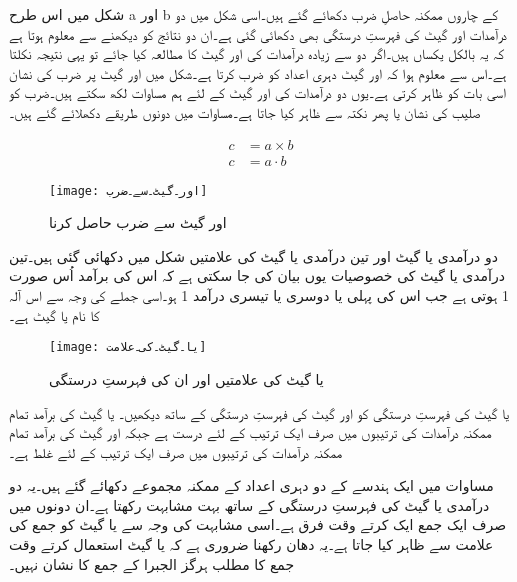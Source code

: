 شکل میں اس طرح a اور b کے چاروں ممکنہ حاصلِ ضرب دکھائے گئے ہیں۔اسی شکل میں دو درآمدات اور گیٹ کی فہرستِ درستگی بھی دکھائی گئی ہے۔ان دو نتائج کو دیکھنے سے معلوم ہوتا ہے کہ یہ بالکل یکساں ہیں۔اگر دو سے زیادہ درآمدات کی اور گیٹ کا مطالعہ کیا جائے تو یہی نتیجہ نکلتا ہے۔اس سے معلوم ہوا کہ اور گیٹ دہری اعداد کو ضرب کرتا ہے۔شکل میں اور گیٹ پر ضرب کی نشان اسی بات کو ظاہر کرتی ہے۔یوں دو درآمدات کی اور گیٹ کے لئے ہم  مساوات  لکھ سکتے ہیں۔ضرب کو صلیب کی نشان یا پھر نکتہ سے ظاہر کیا جاتا ہے۔مساوات میں دونوں طریقے دکھلائے گئے ہیں۔

\begin{align}   \label{مساوات۔اور۔گیٹ۔سے۔دہری۔ضرب}
c &=a \times b \\
c &=a \cdot b
\end{align}


\begin{figure}[th] 
 \begin{center}
  \texttt{[image: اور۔گیٹ۔سے۔ضرب]}
 \end{center}
\caption{اور گیٹ سے ضرب حاصل کرنا}
\label{شکل۔اور۔گیٹ۔سے۔ضرب}
\end{figure}


دو درآمدی یا گیٹ  اور تین درآمدی یا گیٹ کی علامتیں شکل  میں دکھائی گئی ہیں۔تین درآمدی یا گیٹ کی خصوصیات یوں بیان کی جا سکتی ہے کہ اس کی برآمد اُس صورت 1 ہوتی ہے جب اس کی پہلی یا دوسری یا تیسری درآمد 1 ہو۔اسی جملے کی وجہ سے اس آلہ کا نام یا گیٹ ہے۔

\begin{figure}[th]
 \begin{center}
  \texttt{[image: یا۔گیٹ۔کی۔علامت]}
 \end{center}
\caption{یا گیٹ کی علامتیں اور ان کی فہرستِ درستگی}
\label{شکل۔یا۔گیٹ۔کی۔علامت}
\end{figure}

یا گیٹ کی فہرستِ درستگی کو اور گیٹ کی فہرستِ درستگی کے ساتھ دیکھیں۔ یا گیٹ کی برآمد تمام ممکنہ درآمدات کی ترتیبوں میں صرف ایک ترتیب کے لئے درست ہے جبکہ اور گیٹ کی برآمد تمام ممکنہ درآمدات کی ترتیبوں میں صرف ایک ترتیب کے لئے غلط ہے۔

مساوات  میں ایک ہندسے کے دو دہری اعداد کے ممکنہ مجموعے دکھائے گئے ہیں۔یہ دو درآمدی یا گیٹ کی فہرستِ درستگی کے ساتھ بہت مشابہت رکھتا ہے۔ان دونوں میں صرف ایک جمع ایک کرتے وقت فرق ہے۔اسی مشابہت کی وجہ سے یا گیٹ کو جمع کی علامت سے ظاہر کیا جاتا ہے۔یہ دھان رکھنا ضروری ہے کہ یا گیٹ استعمال کرتے وقت جمع کا مطلب ہرگز الجبرا کے جمع کا نشان نہیں۔

